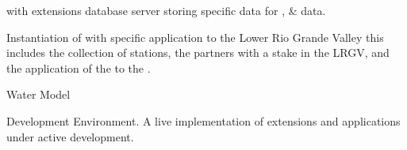 \documentclass[letterpaper,12pt,english,openany,oneside]{sphinxmanual}
\begin{document}
\begin{description}
\sphinxAtStartPar
{\hyperref[\detokenize{_static/glossary:term-PostgreSQL}]{}} with {\hyperref[\detokenize{_static/glossary:term-PostGIS}]{}} extensions database server storing {\hyperref[\detokenize{_static/glossary:term-REON}]{}} specific data for {\hyperref[\detokenize{_static/glossary:term-RTHS}]{}}, {\hyperref[\detokenize{_static/glossary:term-REON-WM}]{}} \& {\hyperref[\detokenize{_static/glossary:term-REON.cc}]{}} data.

\sphinxAtStartPar
Instantiation of {\hyperref[\detokenize{_static/glossary:term-REON}]{}} with specific application to the Lower Rio Grande Valley \sphinxhyphen{} this includes the collection of {\hyperref[\detokenize{_static/glossary:term-RTHS}]{}} stations, the {\hyperref[\detokenize{_static/glossary:term-REON}]{}} partners with a stake in the LRGV, and the application of the {\hyperref[\detokenize{_static/glossary:term-REON-WM}]{}} to the {\hyperref[\detokenize{_static/glossary:term-LRGV}]{}}.

\sphinxAtStartPar
{\hyperref[\detokenize{_static/glossary:term-REON}]{}} Water Model

\sphinxAtStartPar
{\hyperref[\detokenize{_static/glossary:term-REON}]{}} Development Environment. A live implementation of {\hyperref[\detokenize{_static/glossary:term-REON.cc}]{}} extensions and applications under active development.


\end{description}
\end{document}
